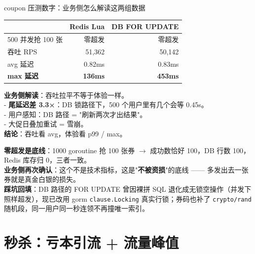 \documentclass[aspectratio=169,11pt]{beamer}
\begin{document}
\begin{frame}[shrink]{coupon 压测数字：业务侧怎么解读这两组数据}
\begin{minipage}[t]{0.46\linewidth}
\scriptsize
\begin{tabular}{@{}lrr@{}}
\toprule
& Redis Lua & DB FOR UPDATE \\
\midrule
500 并发抢 100 张 & 零超发 & 零超发 \\
吞吐 RPS          & 51{,}362 & 50{,}142 \\
avg 延迟          & 0.82ms   & 0.83ms  \\
\textbf{max 延迟} & \textbf{136ms} & \textbf{453ms} \\
\bottomrule
\end{tabular}
\end{minipage}
\hfill
\begin{minipage}[t]{0.50\linewidth}
\scriptsize \textbf{业务侧解读}：吞吐拉平不等于体验一样。\\
- \textbf{尾延迟差 3.3×}：DB 锁路径下，500 个用户里有几个会等 0.45s。\\
- 用户感知：DB 路径 = "刷新两次才出结果"。\\
- 大促日叠加重试 = 雪崩。\\
\textbf{结论}：吞吐看 avg，体验看 p99 / max。
\end{minipage}
\vspace{2mm}

\small \textbf{零超发是底线}：1000 goroutine 抢 100 张券 $\to$ 成功数恰好 100，DB 行数 100，Redis 库存归 0，三者一致。\\
\textbf{业务侧再次确认}：这个不是技术指标，这是"\textbf{不被资损}"的底线 —— 多发出去一张券就是真金白银的损失。\\
\textbf{踩坑回填}：DB 路径的 FOR UPDATE 曾因裸拼 SQL 退化成无锁空操作（并发下照样超发），现已改用 gorm \texttt{clause.Locking} 真实行锁；券码也补了 \texttt{crypto/rand} 随机段，同一用户同一秒连领不再撞唯一索引。
\end{frame}

\section{秒杀：亏本引流 + 流量峰值}
\end{document}
